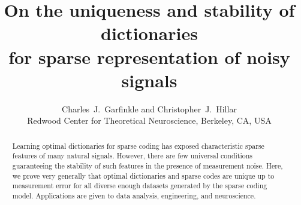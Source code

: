 \documentclass[journal, twocolumn]{IEEEtran}
\begin{document}
\title{On the uniqueness and stability of dictionaries \\ for sparse representation of noisy signals}

\author{Charles~J.~Garfinkle and Christopher~J.~Hillar \\
Redwood Center for Theoretical Neuroscience, Berkeley, CA, USA
}

\maketitle


\begin{abstract}
Learning optimal dictionaries for sparse coding has exposed characteristic sparse features of many natural signals. However, there are few universal conditions guaranteeing the stability of such features in the presence of measurement noise. Here, we prove very generally that optimal dictionaries and sparse codes are unique up to measurement error for all diverse enough datasets generated by the sparse coding model. Applications are given to data analysis, engineering, and neuroscience. 
\end{abstract}

\end{document}
